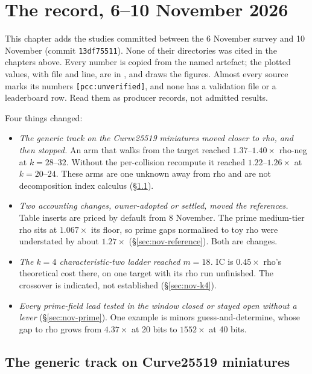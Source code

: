 \chapter{The record, 6--10 November 2026}\label{ch:november}

This chapter adds the studies committed between the 6 November survey and
10 November (commit \texttt{13df75511}). None of their directories was cited
in the chapters above. Every number is copied from the named artefact; the
plotted values, with file and line, are in
, and 
draws the figures. Almost every source marks its numbers
\texttt{[pcc:unverified]}, and none has a validation file or a leaderboard
row. Read them as producer records, not admitted results.

Four things changed:
\begin{itemize}
\item \emph{The generic track on the Curve25519 miniatures moved closer to
  rho, and then stopped.} An arm that walks from the target reached
  $1.37$--$1.40\times$ rho-neg at $k=28$--$32$. Without the per-collision
  recompute it reached $1.22$--$1.26\times$ at $k=20$--$24$. These arms are
  one unknown away from rho and are not decomposition index calculus
  (\S\ref{sec:nov-generic}).
\item \emph{Two accounting changes, owner-adopted or settled, moved the
  references.} Table inserts are priced by default from 8 November. The
  prime medium-tier rho sits at $1.067\times$ its floor, so prime gaps
  normalised to toy rho were understated by about $1.27\times$
  (\S\ref{sec:nov-reference}). Both are  changes.
\item \emph{The $k=4$ characteristic-two ladder reached $m=18$.} IC is
  $0.45\times$ rho's theoretical cost there, on one target with its rho run
  unfinished. The crossover is indicated, not established
  (\S\ref{sec:nov-k4}).
\item \emph{Every prime-field lead tested in the window closed or stayed
  open without a lever} (\S\ref{sec:nov-prime}). One example is minors
  guess-and-determine, whose gap to rho grows from $4.37\times$ at 20 bits
  to $1552\times$ at 40 bits.
\end{itemize}

\section{The generic track on Curve25519 miniatures}\label{sec:nov-generic}

